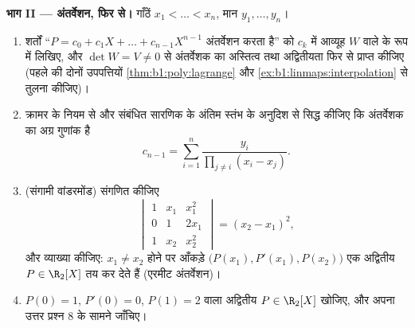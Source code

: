 \begin{problem}
\medskip \noindent\textbf{भाग II --- अंतर्वेशन, फिर से।} गाँठें $x_1 < \dots
< x_n$, मान $y_1, \dots, y_n$।
\begin{enumerate}[resume]
  \item शर्तों ``$P = c_0 + c_1X + \dots + c_{n-1}X^{n-1}$ अंतर्वेशन करता
  है'' को $c_k$ में आव्यूह $W$ वाले  के रूप में लिखिए, और $\det W
  = V \neq 0$ से अंतर्वेशक का अस्तित्व तथा अद्वितीयता फिर से प्राप्त कीजिए
  (पहले की दोनों उपपत्तियों \cref{thm:b1:poly:lagrange} और
  \cref{ex:b1:linmaps:interpolation} से तुलना कीजिए)।
  \item क्रामर के नियम से और संबंधित सारणिक के अंतिम स्तंभ के अनुदिश
   से सिद्ध कीजिए कि अंतर्वेशक का अग्र गुणांक है
        \[
        c_{n-1} = \sum_{i=1}^{n}
        \frac{y_i}{\prod_{j \neq i}(x_i - x_j)} .
        \]
  \item (संगामी वांडरमोंड) संगणित कीजिए
        \[
        \begin{vmatrix}
        1 & x_1 & x_1^2\\
        0 & 1 & 2x_1\\
        1 & x_2 & x_2^2
        \end{vmatrix}
        = (x_2 - x_1)^2 ,
        \]
        और व्याख्या कीजिए: $x_1 \neq x_2$ होने पर आँकड़े $\bigl(P(x_1),
        P'(x_1), P(x_2)\bigr)$ एक अद्वितीय $P \in \R_2[X]$ तय कर देते हैं
        (एरमीट अंतर्वेशन)।
  \item $P(0) = 1$, $P'(0) = 0$, $P(1) = 2$ वाला अद्वितीय $P \in \R_2[X]$
  खोजिए, और अपना उत्तर प्रश्न 8 के सामने जाँचिए।
\end{enumerate}


\end{problem}
